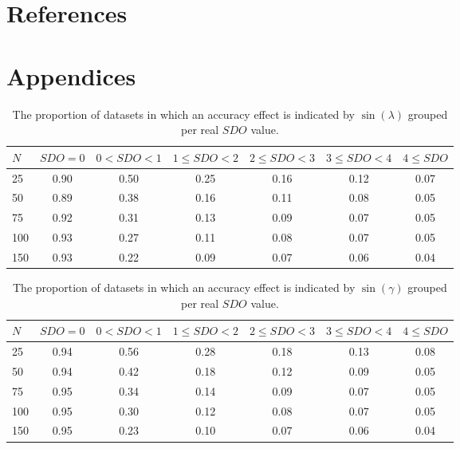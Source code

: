\documentclass[]{interact}
\begin{document}
\section{References}







\section{Appendices}

\appendix

\begin{table}[ht]
\centering
\caption{The proportion of datasets in which an accuracy effect is indicated by $\sin(\lambda)$ grouped per real $SDO$ value.} 
\begin{tabular}{lcccccc}
  \noalign{\smallskip}\hline\noalign{\smallskip}
$N$ & $SDO = 0$ & $ 0 < SDO < 1$ & $1 \leq SDO < 2$ & $2 \leq SDO < 3$ &  $3 \leq SDO < 4$ & $4 \leq SDO$\\ \hline\noalign{\smallskip}
25 & 0.90 & 0.50 & 0.25 & 0.16 & 0.12 & 0.07\\
50 & 0.89 & 0.38 & 0.16 & 0.11 & 0.08 & 0.05\\
75 & 0.92 & 0.31 & 0.13 & 0.09 & 0.07 & 0.05\\
100& 0.93 & 0.27 & 0.11 & 0.08 & 0.07 & 0.05\\
150& 0.93 & 0.22 & 0.09 & 0.07 & 0.06 & 0.04\\
   \hline
\end{tabular}
\label{TableResdetmin}
\end{table}

\begin{table}[ht]
\centering
\caption{The proportion of datasets in which an accuracy effect is indicated by $\sin(\gamma)$ grouped per real $SDO$ value.} 
\begin{tabular}{lcccccc}
  \noalign{\smallskip}\hline\noalign{\smallskip}
$N$ & $SDO = 0$ & $ 0 < SDO < 1$ & $1 \leq SDO < 2$ & $2 \leq SDO < 3$ &  $3 \leq SDO < 4$ & $4 \leq SDO$\\ \hline\noalign{\smallskip}
25 & 0.94 & 0.56 & 0.28 & 0.18 & 0.13 & 0.08 \\
50 & 0.94 & 0.42 & 0.18 & 0.12 & 0.09 & 0.05 \\
75 & 0.95 & 0.34 & 0.14 & 0.09 & 0.07 & 0.05 \\
100& 0.95 & 0.30 & 0.12 & 0.08 & 0.07 & 0.05 \\
150& 0.95 & 0.23 & 0.10 & 0.07 & 0.06 & 0.04 \\
   \hline
\end{tabular}
\label{TableResdetmax}
\end{table}
\end{document}
